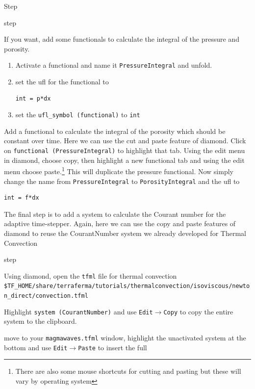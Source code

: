 \begin{steps}{Step}
\begin{steps}{step}
  \item If you want, add some functionals to calculate the integral of the
    pressure and porosity.
    \begin{enumerate}
    \item Activate a functional and name it \texttt{PressureIntegral}
      and unfold.
    \item set the ufl for the functional to
      \begin{lstlisting}[style=ufl]
        int = p*dx
      \end{lstlisting}
    \item set the \texttt{ufl\_symbol (functional)} to \texttt{int}
    \end{enumerate}
  \item Add a functional to calculate the integral of the porosity
    which should be constant over time. Here we can use the cut and
    paste feature of diamond.  Click on \texttt{functional
      (PressureIntegral)} to highlight that tab.  Using the edit menu
    in diamond, choose copy,  then highlight a new functional tab and
    using the edit menu choose paste.\footnote{There are also some
      mouse shortcuts for cutting and pasting but these will vary by
      operating system}  This will duplicate the
    pressure functional.  Now simply change the name from
    \texttt{PressureIntegral} to \texttt{PorosityIntegral} and the ufl to
    \begin{lstlisting}[style=ufl]
        int = f*dx
     \end{lstlisting}
  \end{steps}
\item The final step is to add a system to calculate the Courant
  number for the adaptive time-stepper.  Again,  here we can use the
  copy and paste features of diamond to reuse the CourantNumber system
  we already developed for Thermal Convection
  \begin{steps}{step}  
  \item Using diamond, open the \texttt{tfml} file for
    thermal convection \texttt{\$TF\_HOME/share/terraferma/tutorials/thermalconvection/isoviscous/newton\_direct/convection.tfml}
  \item Highlight \texttt{system (CourantNumber)} and use
    \texttt{Edit}$\rightarrow$\texttt{Copy} to copy the entire system
    to the clipboard.
  \item move to your \texttt{magmawaves.tfml} window, highlight the
    unactivated system at the bottom and use
    \texttt{Edit}$\rightarrow$\texttt{Paste} to insert the full

\end{steps}
\end{steps}
